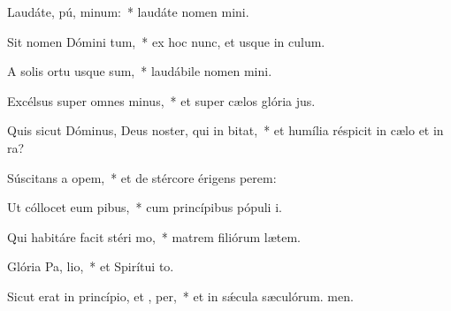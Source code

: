 \item Laudáte, pú, minum:~* laudáte nomen mini.
\item Sit nomen Dómini tum,~* ex hoc nunc, et usque in culum.
\item A solis ortu usque  sum,~* laudábile nomen mini.
\item Excélsus super omnes  minus,~* et super cælos glória jus.
\item Quis sicut Dóminus, Deus noster, qui in  bitat,~* et humília réspicit in cælo et in ra?
\item Súscitans a  opem,~* et de stércore érigens perem:
\item Ut cóllocet eum  pibus,~* cum princípibus pópuli i.
\item Qui habitáre facit stéri  mo,~* matrem filiórum lætem.
\item Glória Pa,  lio,~* et Spirítui to.
\item Sicut erat in princípio, et ,  per,~* et in sǽcula sæculórum. men.
